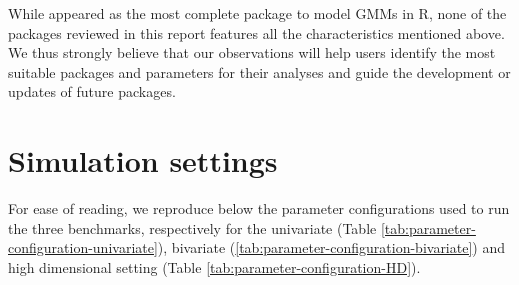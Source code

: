 While  appeared as the most complete package to model GMMs in R, none of the packages reviewed in this report features all the characteristics mentioned above.
We thus strongly believe that our observations will help users identify the most suitable packages and parameters for their analyses and guide the development or updates of future packages.

\hypertarget{simulation-settings}{%
\section{Simulation settings}\label{simulation-settings}}

For ease of reading, we reproduce below the parameter configurations used to run the three benchmarks, respectively for the univariate (Table \ref{tab:parameter-configuration-univariate}), bivariate (\ref{tab:parameter-configuration-bivariate}) and high dimensional setting (Table \ref{tab:parameter-configuration-HD}).

\begin{table}[!h]

\caption{\label{tab:parameter-configuration-univariate}The 9 parameter configurations tested to generate the samples of the univariate experiment, with $k=4$ components.}
\centering
{}
\end{table}

